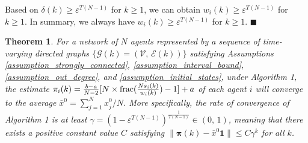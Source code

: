 \documentclass{IEEEtran}
\newtheorem{Theorem}{Theorem}
\begin{document}
Based on $\delta(k) \geq \varepsilon^{T(N-1)}$ for $k \geq 1$, we can obtain $w_i(k) \geq \varepsilon^{T(N-1)}$ for $k \geq 1$. In summary, we always have $w_i(k) \geq \varepsilon^{T(N-1)}$ for $k \geq 1$. \hfill{$\blacksquare$}

\begin{Theorem}\label{theorem_convergence}
	For a network of $N$ agents represented by a sequence of time-varying directed graphs $\{\mathcal{G}(k)=(\mathcal{V}, \, \mathcal{E}(k))\}$ satisfying Assumptions \ref{assumption_strongly_connected}, \ref{assumption_interval_bound}, \ref{assumption_out_degree}, and \ref{assumption_initial_states}, under Algorithm 1, the estimate $\pi_i(k)=\frac{b-a}{N-2}[N \times {\rm frac}(\frac{Ns_i(k)}{w_i(k)})-1]+a$ of each agent $i$ will converge to the average $\bar{x}^0={\sum_{j=1}^{N}x_j^0}/N$. More specifically, the rate of convergence of Algorithm 1 is at least $\gamma= (1-\varepsilon^{T(N-1)}) ^{\frac{1}{T(N-1)}} \in (0, \, 1)$, meaning that there exists a positive constant value $C$ satisfying $\big\|\boldsymbol{\pi}(k) - \bar{x}^0 \mathbf{1} \big\| \leq C \gamma ^k$ for all $k$.
\end{Theorem}
\end{document}
